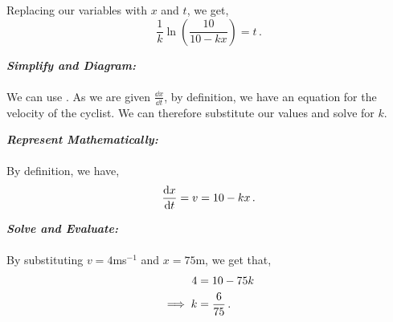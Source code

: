 \begin{subquestions}
\begin{subsubquestions}
Replacing our variables with $x$ and $t$, we get,
\begin{equation}
	\frac{1}{k} \ln\left(\frac{10}{10-kx}\right) = t \,.
\end{equation}

\subsubquestion

\textbf{\textit{Simplify and Diagram:}} \\ \\
We can use . As we are given $\frac{\dd x}{\dd t}$, by definition, we have an equation for the velocity of the cyclist. We can therefore substitute our values and solve for $k$.




\textbf{\textit{Represent Mathematically:}} \\ \\
By definition, we have,
\begin{equation}
	\frac{\mathrm{d}x}{\mathrm{d}t}=v = 10-kx \,.
\end{equation}




\textbf{\textit{Solve and Evaluate:}} \\ \\
By substituting $v=4$ms$^{-1}$ and $x=75$m, we get that,
\begin{align}
	4 & = 10-75k \nonumber \\
	\implies k & = \frac{6}{75} \,.
\end{align}

\end{subsubquestions}

\end{subquestions}